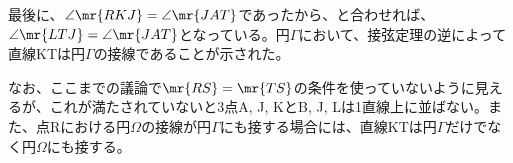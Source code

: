 最後に、$\angle\mr{RKJ}=\angle\mr{JAT}$であったから、と合わせれば、$\angle\mr{LTJ}=\angle\mr{JAT}$となっている。円$\Gamma$において、接弦定理の逆によって直線KTは円$\Gamma$の接線であることが示された。

なお、ここまでの議論で$\mr{RS}=\mr{TS}$の条件を使っていないように見えるが、これが満たされていないと3点A, J, KとB, J, Lは1直線上に並ばない。また、点Rにおける円$\Omega$の接線が円$\Gamma$にも接する場合には、直線KTは円$\Gamma$だけでなく円$\Omega$にも接する。